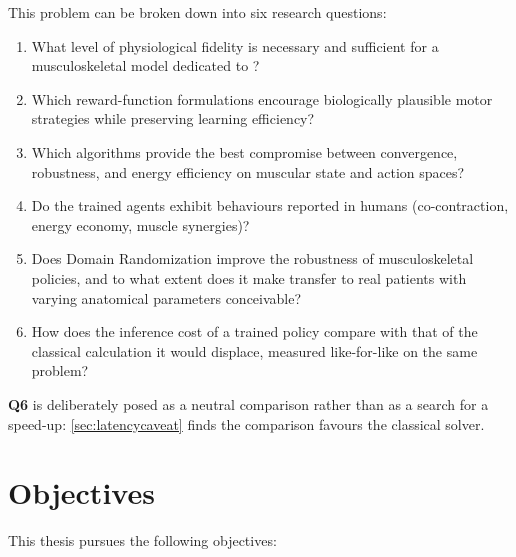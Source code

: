 This problem can be broken down into six research questions:
\begin{enumerate}[label=\textbf{Q\arabic*.}, leftmargin=2.2em]
  \item What level of physiological fidelity is necessary and sufficient for a
        musculoskeletal model dedicated to \DRL{}?
  \item Which reward-function formulations encourage biologically plausible motor
        strategies while preserving learning efficiency?
  \item Which \DRL{} algorithms provide the best compromise between convergence,
        robustness, and energy efficiency on muscular state and action spaces?
  \item Do the trained agents exhibit behaviours reported in humans
        (co-contraction, energy economy, muscle synergies)?
  \item Does Domain Randomization improve the robustness of musculoskeletal policies,
        and to what extent does it make transfer to real patients with varying
        anatomical parameters conceivable?
  \item[\textbf{Q6.}] How does the inference cost of a trained policy compare with
        that of the classical calculation it would displace, measured
        like-for-like on the same problem?
\end{enumerate}

\textbf{Q6} is deliberately posed as a neutral comparison rather than as a search
for a speed-up: \cref{sec:latencycaveat} finds the comparison favours the
classical solver.

\section{Objectives}

This thesis pursues the following objectives:

